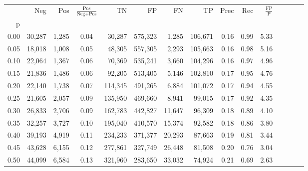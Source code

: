 \begin{tabular}{rrrcrrrrrrrrrrr}
\toprule
{} &     Neg &     Pos & $\frac{\text{Pos}}{\text{Neg}+\text{Pos}}$ &       TN &       FP &       FN &       TP &  Prec &   Rec & $\frac{\text{FP}}{\text{P}}$ \\
p    &         &         &                                            &          &          &          &          &       &       &                              \\
\midrule
0.00 &  30,287 &   1,285 &                                       0.04 &   30,287 &  575,323 &    1,285 &  106,671 &  0.16 &  0.99 &                         5.33 \\
0.05 &  18,018 &   1,008 &                                       0.05 &   48,305 &  557,305 &    2,293 &  105,663 &  0.16 &  0.98 &                         5.16 \\
0.10 &  22,064 &   1,367 &                                       0.06 &   70,369 &  535,241 &    3,660 &  104,296 &  0.16 &  0.97 &                         4.96 \\
0.15 &  21,836 &   1,486 &                                       0.06 &   92,205 &  513,405 &    5,146 &  102,810 &  0.17 &  0.95 &                         4.76 \\
0.20 &  22,140 &   1,738 &                                       0.07 &  114,345 &  491,265 &    6,884 &  101,072 &  0.17 &  0.94 &                         4.55 \\
0.25 &  21,605 &   2,057 &                                       0.09 &  135,950 &  469,660 &    8,941 &   99,015 &  0.17 &  0.92 &                         4.35 \\
0.30 &  26,833 &   2,706 &                                       0.09 &  162,783 &  442,827 &   11,647 &   96,309 &  0.18 &  0.89 &                         4.10 \\
0.35 &  32,257 &   3,727 &                                       0.10 &  195,040 &  410,570 &   15,374 &   92,582 &  0.18 &  0.86 &                         3.80 \\
0.40 &  39,193 &   4,919 &                                       0.11 &  234,233 &  371,377 &   20,293 &   87,663 &  0.19 &  0.81 &                         3.44 \\
0.45 &  43,628 &   6,155 &                                       0.12 &  277,861 &  327,749 &   26,448 &   81,508 &  0.20 &  0.76 &                         3.04 \\
0.50 &  44,099 &   6,584 &                                       0.13 &  321,960 &  283,650 &   33,032 &   74,924 &  0.21 &  0.69 &                         2.63 \\

\end{tabular}
